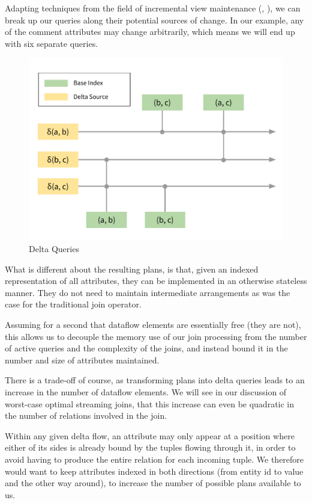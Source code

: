 \documentclass[../catalog.tex]{subfiles}
\begin{document}
Adapting techniques from the field of incremental view maintenance
(\cite{gupta1993maintaining}, \cite{blakeley1986efficiently}), we can
break up our queries along their potential sources of change. In our
example, any of the comment attributes may change arbitrarily, which
means we will end up with six separate queries.

\begin{figure}[h!]
  \includegraphics[width=1.0\linewidth]{diagrams/delta-queries}
  \caption{Delta Queries}
  \label{fig:delta-query-plan}
\end{figure}

What is different about the resulting plans, is that, given an indexed
representation of all attributes, they can be implemented in an
otherwise stateless manner. They do not need to maintain intermediate
arrangements as was the case for the traditional join operator.

Assuming for a second that dataflow elements are essentially free
(they are not), this allows us to decouple the memory use of our join
processing from the number of active queries and the complexity of the
joins, and instead bound it in the number and size of attributes
maintained.

There is a trade-off of course, as transforming plans into delta
queries leads to an increase in the number of dataflow elements. We
will see in our discussion of worst-case optimal streaming joins, that
this increase can even be quadratic in the number of relations
involved in the join.

Within any given delta flow, an attribute may only appear at a
position where either of its sides is already bound by the tuples
flowing through it, in order to avoid having to produce the entire
relation for each incoming tuple. We therefore would want to keep
attributes indexed in both directions (from entity id to value and the
other way around), to increase the number of possible plans available
to us.
\end{document}
